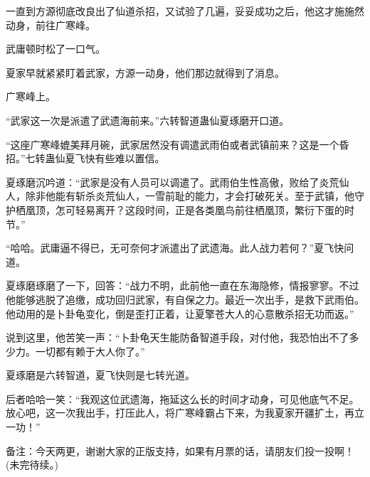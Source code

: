 \begin{this_body}
一直到方源彻底改良出了仙道杀招，又试验了几遍，妥妥成功之后，他这才施施然动身，前往广寒峰。

武庸顿时松了一口气。

夏家早就紧紧盯着武家，方源一动身，他们那边就得到了消息。

广寒峰上。

“武家这一次是派遣了武遗海前来。”六转智道蛊仙夏琢磨开口道。

“这座广寒峰媲美拜月碗，武家居然没有调遣武雨伯或者武镇前来？这是一个昏招。”七转蛊仙夏飞快有些难以置信。

夏琢磨沉吟道：“武家是没有人员可以调遣了。武雨伯生性高傲，败给了炎荒仙人，除非他能有斩杀炎荒仙人，一雪前耻的能力，才会打破死关。至于武镇，他守护栖凰顶，怎可轻易离开？这段时间，正是各类凰鸟前往栖凰顶，繁衍下蛋的时节。”

“哈哈。武庸逼不得已，无可奈何才派遣出了武遗海。此人战力若何？”夏飞快问道。

夏琢磨琢磨了一下，回答：“战力不明，此前他一直在东海隐修，情报寥寥。不过他能够逃脱了追缴，成功回归武家，有自保之力。最近一次出手，是救下武雨伯。他动用的是卜卦龟变化，倒是歪打正着，让夏擎苍大人的心意散杀招无功而返。”

说到这里，他苦笑一声：“卜卦龟天生能防备智道手段，对付他，我恐怕出不了多少力。一切都有赖于大人你了。”

夏琢磨是六转智道，夏飞快则是七转光道。

后者哈哈一笑：“我观这位武遗海，拖延这么长的时间才动身，可见他底气不足。放心吧，这一次我出手，打压此人，将广寒峰霸占下来，为我夏家开疆扩土，再立一功！”

备注：今天两更，谢谢大家的正版支持，如果有月票的话，请朋友们投一投啊！(未完待续。)

\end{this_body}

